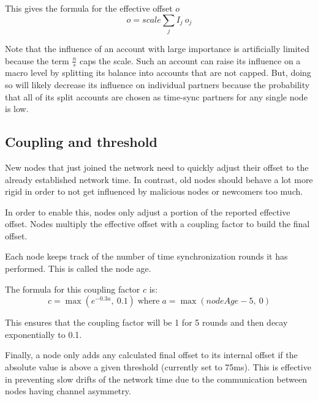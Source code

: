 This gives the formula for the effective offset $o$
$$ o = scale \sum_j I_j \: o_j$$

Note that the influence of an account with large importance is artificially limited because the term $\frac{\textit{n}}{\textit{s}} $ caps the scale.
Such an account can raise its influence on a macro level by splitting its balance into accounts that are not capped.
But, doing so will likely decrease its influence on individual partners because the probability that all of its split accounts are chosen as time-sync partners for any single node is low.

\subsection{Coupling and threshold}

New nodes that just joined the network need to quickly adjust their offset to the already established network time. In contrast, old nodes should behave a lot more rigid in order to not get influenced by malicious nodes or newcomers too much.

In order to enable this, nodes only adjust a portion of the reported effective offset.
Nodes multiply the effective offset with a coupling factor to build the final offset.

Each node keeps track of the number of time synchronization rounds it has performed.
This is called the node age.

The formula for this coupling factor $c$ is:
$$c = \max\left(e^{-0.3a},\: 0.1\right) \; \text{where} \; a = \max(nodeAge - 5,\: 0)$$

This ensures that the coupling factor will be 1 for 5 rounds and then decay exponentially to 0.1.

\begin{figure}
\end{figure}

Finally, a node only adds any calculated final offset to its internal offset if the absolute value is above a given threshold (currently set to 75ms).
This is effective in preventing slow drifts of the network time due to the communication between nodes having channel asymmetry.
